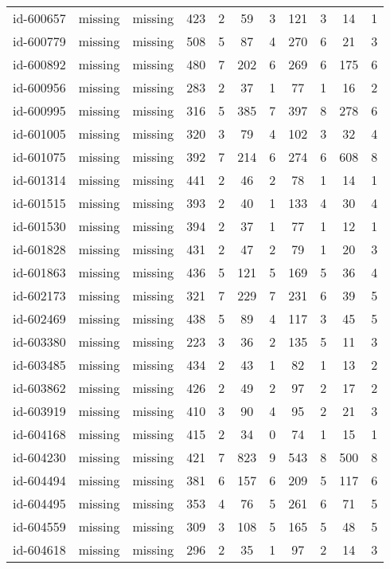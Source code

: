 \begin{tabular}{ccccccccccc}
id-600657 & missing & missing & 423 & 2 & 59 & 3 & 121 & 3 & 14 & 1\\
id-600779 & missing & missing & 508 & 5 & 87 & 4 & 270 & 6 & 21 & 3\\
id-600892 & missing & missing & 480 & 7 & 202 & 6 & 269 & 6 & 175 & 6\\
id-600956 & missing & missing & 283 & 2 & 37 & 1 & 77 & 1 & 16 & 2\\
id-600995 & missing & missing & 316 & 5 & 385 & 7 & 397 & 8 & 278 & 6\\
id-601005 & missing & missing & 320 & 3 & 79 & 4 & 102 & 3 & 32 & 4\\
id-601075 & missing & missing & 392 & 7 & 214 & 6 & 274 & 6 & 608 & 8\\
id-601314 & missing & missing & 441 & 2 & 46 & 2 & 78 & 1 & 14 & 1\\
id-601515 & missing & missing & 393 & 2 & 40 & 1 & 133 & 4 & 30 & 4\\
id-601530 & missing & missing & 394 & 2 & 37 & 1 & 77 & 1 & 12 & 1\\
id-601828 & missing & missing & 431 & 2 & 47 & 2 & 79 & 1 & 20 & 3\\
id-601863 & missing & missing & 436 & 5 & 121 & 5 & 169 & 5 & 36 & 4\\
id-602173 & missing & missing & 321 & 7 & 229 & 7 & 231 & 6 & 39 & 5\\
id-602469 & missing & missing & 438 & 5 & 89 & 4 & 117 & 3 & 45 & 5\\
id-603380 & missing & missing & 223 & 3 & 36 & 2 & 135 & 5 & 11 & 3\\
id-603485 & missing & missing & 434 & 2 & 43 & 1 & 82 & 1 & 13 & 2\\
id-603862 & missing & missing & 426 & 2 & 49 & 2 & 97 & 2 & 17 & 2\\
id-603919 & missing & missing & 410 & 3 & 90 & 4 & 95 & 2 & 21 & 3\\
id-604168 & missing & missing & 415 & 2 & 34 & 0 & 74 & 1 & 15 & 1\\
id-604230 & missing & missing & 421 & 7 & 823 & 9 & 543 & 8 & 500 & 8\\
id-604494 & missing & missing & 381 & 6 & 157 & 6 & 209 & 5 & 117 & 6\\
id-604495 & missing & missing & 353 & 4 & 76 & 5 & 261 & 6 & 71 & 5\\
id-604559 & missing & missing & 309 & 3 & 108 & 5 & 165 & 5 & 48 & 5\\
id-604618 & missing & missing & 296 & 2 & 35 & 1 & 97 & 2 & 14 & 3\\

\end{tabular}

